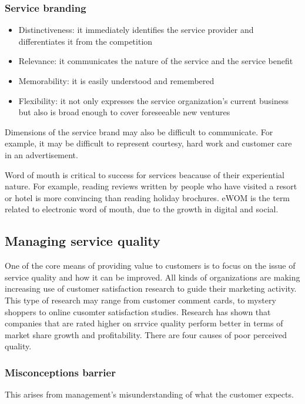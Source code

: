 \documentclass{article}
\begin{document}
\subsubsection*{Service branding}
\begin{itemize}
    \item Distinctiveness: it immediately identifies the service provider and differentiates it from the competition
    \item Relevance: it communicates the nature of the service and the service benefit
    \item Memorability: it is easily understood and remembered
    \item Flexibility: it not only expresses the service organization's current business but also is broad enough to cover foreseeable new ventures
\end{itemize}

Dimensions of the service brand may also be difficult to communicate. For example, it may be difficult to represent courtesy, hard work and customer care in an advertisement. 


Word of mouth is critical to success for services beacause of their experiential nature. For example, reading reviews written by people who have visited a resort or hotel is more convincing than reading holiday brochures. eWOM is the term related to electronic word of mouth, due to the growth in digital and social. 

\subsection{Managing service quality}
One of the core means of providing value to customers is to focus on the issue of service quality and how it can be improved. All kinds of organizations are making increasing use of customer satisfaction research to guide their marketing activity. This type of research may range from customer comment cards, to mystery shoppers to online cusomter satisfaction studies. Research has shown that companies that are rated higher on srrvice quality perform better in terms of market share growth and profitability. There are four causes of poor perceived quality.

\subsubsection*{Misconceptions barrier}
This arises from management's misunderstanding of what the customer expects.
\end{document}
